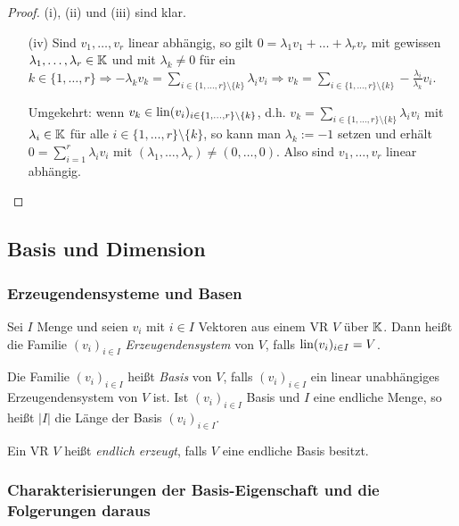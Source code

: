 \begin{proof} (i), (ii) und (iii) sind klar.
\begin{itemize}
	\item[(iv)]
	Sind $ v_1, \ldots, v_r $ linear abhängig, so gilt $ 0 = \lambda_1v_1 + \ldots + \lambda_rv_r $ mit gewissen $ \lambda_1, \ldots, \lambda_r \in \mathbb K $ und mit $ \lambda_k \neq 0 $ für ein $ k \in \{ 1, \ldots, r \} \Rightarrow -\lambda_kv_k = \sum_{i \in \{ 1, \ldots, r \} \setminus \{ k \}} \lambda_iv_i \Rightarrow v_k = \sum_{i \in \{ 1, \ldots, r \} \setminus \{ k \}} - \frac{\lambda_i}{\lambda_k}v_i $.
	
	Umgekehrt: wenn $ v_k \in \operatorname{lin}(v_i)_{i \in \{ 1, \ldots, r \} \setminus \{ k \}} $, d.h. $ v_k = \sum_{i \in \{ 1, \ldots, r \} \setminus \{ k \}} \lambda_iv_i $ mit $ \lambda_i \in \mathbb K $ für alle $ i \in \{ 1, \ldots, r \} \setminus \{ k \} $, so kann man $ \lambda_k := -1 $ setzen und erhält $ 0 = \sum_{i = 1}^r \lambda_iv_i $ mit $ ( \lambda_1, \ldots, \lambda_r ) \neq ( 0, \ldots, 0 ) $. Also sind $ v_1, \ldots, v_r $ linear abhängig. \qedhere
\end{itemize}
\end{proof}

\subsection{Basis und Dimension}

\subsubsection{Erzeugendensysteme und Basen}

Sei $ I $ Menge und seien $ v_i $ mit $ i \in I $ Vektoren aus einem VR $ V $ über $ \mathbb K $. Dann heißt die Familie $ (v_i)_{i \in I} $ \emph{Erzeugendensystem} von $ V $, falls $ \operatorname{lin}(v_i)_{i \in I} = V $.

Die Familie $ (v_i)_{i \in I} $ heißt \emph{Basis} von $ V $, falls $ (v_i)_{i \in I} $ ein linear unabhängiges Erzeugendensystem von $ V $ ist. Ist $ (v_i)_{i \in I} $ Basis und $ I $ eine endliche Menge, so heißt $ |I| $ die Länge der Basis $ (v_i)_{i \in I} $.

Ein VR $ V $ heißt \emph{endlich erzeugt}, falls $ V $ eine endliche Basis besitzt.

\subsubsection{Charakterisierungen der Basis-Eigenschaft und die Folgerungen daraus}

